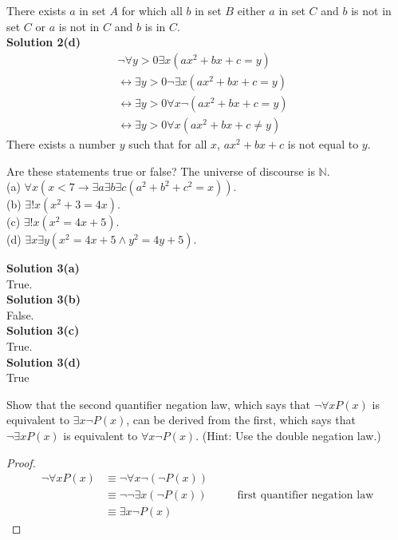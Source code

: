 There exists $a$ in set $A$ for which all $b$ in set $B$ either $a$ in set $C$ and $b$ is not
in set $C$ or $a$ is not in $C$ and $b$ is in $C$. \\
\textbf{Solution 2(d)} \\
\begin{align*}
    & \neg \forall{y > 0} \exists{x}(ax^2 + bx + c = y) && \\
    & \leftrightarrow \exists{y > 0} \neg \exists{x}(ax^2 + bx + c = y) && \\
    & \leftrightarrow \exists{y > 0} \forall{x}\neg(ax^2 + bx + c = y) && \\
    & \leftrightarrow \exists{y > 0} \forall{x}(ax^2 + bx + c \not = y)
\end{align*}
There exists a number $y$ such that for all $x$, $ax^2 + bx + c$ is not equal to $y$.

\begin{tcolorbox}[title=Problem 3, breakable]
    Are these statements true or false? The universe of discourse is $\mathbb{N}$. \\
    (a) $\forall{x}(x < 7 \rightarrow \exists{a}\exists{b}\exists{c}(a^2 + b^2 + c^2 = x))$. \\
    (b) $\exists{!x}(x^2 + 3 = 4x)$. \\
    (c) $\exists{!x}(x^2 = 4x + 5)$. \\
    (d) $\exists{x}\exists{y}(x^2 = 4x + 5 \wedge y^2 = 4y + 5)$.
\end{tcolorbox}

\textbf{Solution 3(a)} \\
True. \\
\textbf{Solution 3(b)} \\
False. \\
\textbf{Solution 3(c)} \\
True. \\
\textbf{Solution 3(d)} \\
True

\begin{tcolorbox}[title=Problem 4, breakable]
    Show that the second quantifier negation law, which says that $\neg\forall{x}P(x)$ is
    equivalent to $\exists{x}\neg P(x)$, can be derived from the first, which says that
    $\neg \exists{x}P(x)$ is equivalent to $\forall{x}\neg P(x)$. (Hint: Use the double 
    negation law.)
\end{tcolorbox}

\begin{proof}
\begin{align*}
    \neg\forall{x}P(x) &\equiv \neg\forall{x}\neg(\neg P(x)) && \\
    &\equiv \neg\neg\exists{x}(\neg P(x)) && \quad \text{first quantifier negation law} \\
    &\equiv \exists{x}\neg P(x)
\end{align*}
\end{proof}

